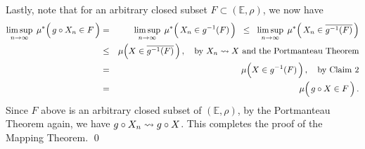 \vskip 0.5cm
\noindent
Lastly, note that for an arbitrary closed subset $F \subset (\mathbb{E},\rho)$, we now have
\begin{eqnarray*}
\underset{n\rightarrow\infty}{\limsup}\;\, \mu^{*}\!\left(\,g \circ X_{n} \overset{{\color{white}.}}{\in} F\,\right)
&=&
	\underset{n\rightarrow\infty}{\limsup}\;\, \mu^{*}\!\left(\,X_{n} \overset{{\color{white}.}}{\in} g^{-1}(F)\,\right)
\;\; \leq \;\;
	\underset{n\rightarrow\infty}{\limsup}\;\, \mu^{*}\!\left(\,X_{n} \overset{{\color{white}.}}{\in} \overline{g^{-1}(F)}\,\right)
\\
&\leq&
	\mu\!\left(X\overset{{\color{white}.}}{\in}\overline{g^{-1}(F)}\,\right),
	\quad\textnormal{by $X_{n} \wconverge X$ and the Portmanteau Theorem}
\\
&=&
	\mu\!\left(X\overset{{\color{white}.}}{\in}g^{-1}(F)\,\right),
	\quad\textnormal{by Claim 2}
\\
&=&
	\mu\!\left(\,g \circ X\overset{{\color{white}.}}{\in}F\,\right).
\end{eqnarray*}
Since $F$ above is an arbitrary closed subset of $(\mathbb{E},\rho)$,
by the Portmanteau Theorem again, we have \;$g \circ X_{n} \rightsquigarrow g \circ X$.
This completes the proof of the Mapping Theorem.
\qed


\renewcommand{\theenumi}{\roman{enumi}}
\renewcommand{\labelenumi}{\textnormal{(\theenumi)}$\;\;$}

